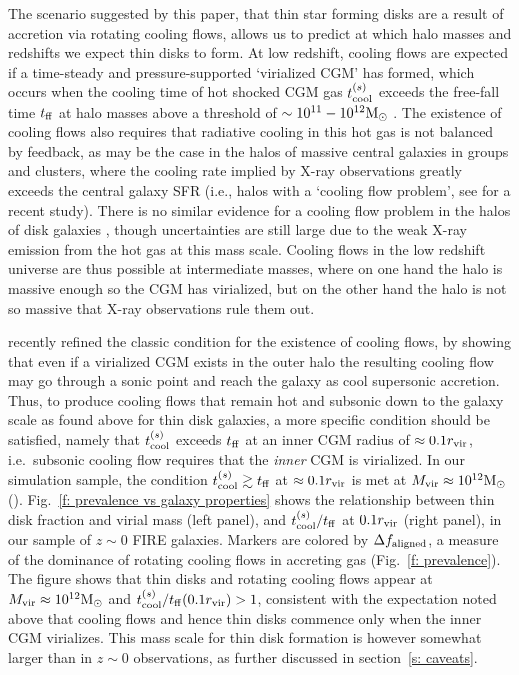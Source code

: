 \documentclass[fleqn,usenatbib]{mnras}
\newcommand{\Rvir}{r_{\rm vir}}
\newcommand{\msun}{{\rm M}_\odot}
\begin{document}
The scenario suggested by this paper, that thin star forming disks are a result of accretion via rotating cooling flows, allows us to predict at which halo masses and redshifts we expect thin disks to form.
At low redshift, cooling flows are expected if a time-steady and pressure-supported `virialized CGM' has formed, which occurs when the cooling time of hot shocked CGM gas $t_{\rm cool}^{(s)}$ exceeds the free-fall time $t_{\rm ff}$ at halo masses above a threshold of $\sim10^{11}-10^{12}\msun$ \citep[e.g.,][]{White1978, White1991, Birnboim2003}.
The existence of cooling flows also requires that radiative cooling in this hot gas is not balanced by feedback, as may be the case in the halos of massive central galaxies in groups and clusters, where the cooling rate implied by X-ray observations greatly exceeds the central galaxy SFR (i.e., halos with a `cooling flow problem', see \citealt{McDonald18} for a recent study).
There is no similar evidence for a cooling flow problem in the halos of disk galaxies \citep{Li14b}, though uncertainties are still large due to the weak X-ray emission from the hot gas at this mass scale. 
Cooling flows in the low redshift universe are thus possible at intermediate masses, where on one hand the halo is massive enough so the CGM has virialized, but on the other hand the halo is not so massive that X-ray observations rule them out. 

\cite{Stern2020} recently refined the classic condition for the existence of cooling flows, by showing that even if a virialized CGM exists in the outer halo the resulting cooling flow may go through a sonic point and reach the galaxy as cool supersonic accretion.
Thus, to produce cooling flows that remain hot and subsonic down to the galaxy scale as found above for thin disk galaxies, a more specific condition should be satisfied, namely that $t_{\rm cool}^{(s)}$ exceeds $t_{\rm ff}$ at an inner CGM radius of $\approx0.1 r_{\rm vir}$, i.e.~subsonic cooling flow requires that the \textit{inner} CGM is virialized. 
In our simulation sample, the condition $t_{\rm cool}^{(s)}\gtrsim t_{\rm ff}$ at $\approx0.1 r_{\rm vir}$ is met at $\Mvir\approx10^{12}\msun$ (\citealt{Stern2021}). 
Fig.~\ref{f: prevalence vs galaxy properties} shows the relationship between thin disk fraction and virial mass (left panel), and $t_{\rm cool}^{(s)}/t_{\rm ff}$ at $0.1 r_{\rm vir}$ (right panel), in our sample of $z\sim0$ FIRE galaxies.
Markers are colored by $\Delta f_{\rm aligned}$, a measure of the dominance of rotating cooling flows in accreting gas (Fig.~\ref{f: prevalence}).
The figure shows that thin disks and rotating cooling flows appear at $M_{\rm vir}\approx 10^{12}\msun$ and $\tcoolsh/\tff(0.1\Rvir)>1$, consistent with the expectation noted above that cooling flows and hence thin disks commence only when the inner CGM virializes.
This mass scale for thin disk formation is however somewhat larger than in $z\sim0$ observations, as further discussed in section~\ref{s: caveats}.
\end{document}
